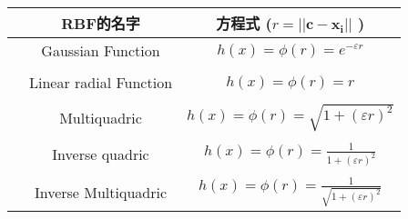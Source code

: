 \begin{tabular}{ccc}
\toprule
  & RBF的名字 & 方程式 (\(r = ||\mathbf{c-x_i}||\) )   \\ 
\midrule
  & Gaussian Function  & \(h(x)=\phi(r) = e^{-\varepsilon r}\)      \\ \\ 
  & Linear radial Function  & \(h(x)=\phi(r) = r\)      \\ \\
  & Multiquadric   & \(h(x)=\phi(r) = \sqrt{1+(\varepsilon r)^2}\)       \\ \\
  & Inverse quadric  &  \(h(x)=\phi(r) = \frac{1}{1+(\varepsilon r)^2}\)     \\ \\ 
  & Inverse Multiquadric  &  \(h(x)=\phi(r) = \frac{1}{\sqrt{1+(\varepsilon r)^2}}\)     \\
\bottomrule
\end{tabular}
